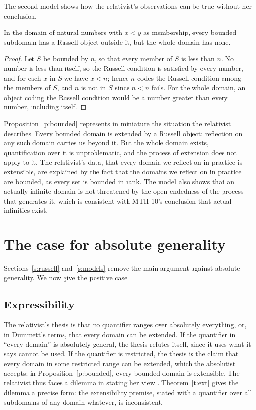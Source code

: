 \documentclass{situationist-preprint}
\begin{document}
The second model shows how the relativist's observations can be true without her conclusion.

\begin{proposition}\label{p:bounded}
In the domain of natural numbers with $x < y$ as membership, every bounded subdomain has a Russell object outside it, but the whole domain has none.
\end{proposition}

\begin{proof}
Let $S$ be bounded by $n$, so that every member of $S$ is less than $n$. No number is less than itself, so the Russell condition is satisfied by every number, and for each $x$ in $S$ we have $x < n$; hence $n$ codes the Russell condition among the members of $S$, and $n$ is not in $S$ since $n < n$ fails. For the whole domain, an object coding the Russell condition would be a number greater than every number, including itself.
\end{proof}

Proposition~\ref{p:bounded} represents in miniature the situation the relativist describes. Every bounded domain is extended by a Russell object; reflection on any such domain carries us beyond it. But the whole domain exists, quantification over it is unproblematic, and the process of extension does not apply to it. The relativist's data, that every domain we reflect on in practice is extensible, are explained by the fact that the domains we reflect on in practice are bounded, as every set is bounded in rank. The model also shows that an actually infinite domain is not threatened by the open-endedness of the process that generates it, which is consistent with MTH-10's conclusion that actual infinities exist.

\section{The case for absolute generality}\label{s:case}

Sections~\ref{s:russell} and~\ref{s:models} remove the main argument against absolute generality. We now give the positive case.

\subsection{Expressibility}

The relativist's thesis is that no quantifier ranges over absolutely everything, or, in Dummett's terms, that every domain can be extended. If the quantifier in \enquote{every domain} is absolutely general, the thesis refutes itself, since it uses what it says cannot be used. If the quantifier is restricted, the thesis is the claim that every domain in some restricted range can be extended, which the absolutist accepts: in Proposition~\ref{p:bounded}, every bounded domain is extensible. The relativist thus faces a dilemma in stating her view \citep{Lewis1991,Williamson2003}. Theorem~\ref{t:ext} gives the dilemma a precise form: the extensibility premise, stated with a quantifier over all subdomains of any domain whatever, is inconsistent.
\end{document}
